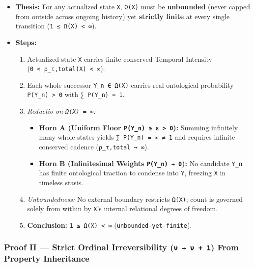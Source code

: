 \documentclass[
]{article}
\begin{document}
\begin{itemize}
\item
  \textbf{Thesis:} For any actualized state \texttt{X}, \texttt{Ω(X)}
  must be \textbf{unbounded} (never capped from outside across ongoing
  history) yet \textbf{strictly finite} at every single transition
  (\texttt{1~≤~Ω(X)~\textless{}~∞}).
\item
  \textbf{Steps:}

  \begin{enumerate}
  \def\labelenumi{\arabic{enumi}.}
  \item
    Actualized state \texttt{X} carries finite conserved Temporal
    Intensity (\texttt{0~\textless{}~ρ\_τ,total(X)~\textless{}~∞}).
  \item
    Each whole successor \texttt{\textquotesingle{}Y\_n~∈~Ω(X)} carries
    real ontological probability
    \texttt{P(\textquotesingle{}Y\_n)~\textgreater{}~0} with
    \texttt{∑~P(\textquotesingle{}Y\_n)~=~1}.
  \item
    \emph{Reductio on \texttt{Ω(X)~=~∞}:}

    \begin{itemize}
    \item
      \textbf{Horn A (Uniform Floor
      \texttt{P(\textquotesingle{}Y\_n)~≥~ε~\textgreater{}~0}):} Summing
      infinitely many whole states yields
      \texttt{∑~P(\textquotesingle{}Y\_n)~=~∞~≠~1} and requires infinite
      conserved cadence (\texttt{ρ\_τ,total~→~∞}).
    \item
      \textbf{Horn B (Infinitesimal Weights
      \texttt{P(\textquotesingle{}Y\_n)~→~0}):} No candidate
      \texttt{\textquotesingle{}Y\_n} has finite ontological traction to
      condense into \texttt{Y}, freezing \texttt{X} in timeless stasis.
    \end{itemize}
  \item
    \emph{Unboundedness:} No external boundary restricts \texttt{Ω(X)};
    count is governed solely from within by \texttt{X}'s internal
    relational degrees of freedom.
  \item
    \textbf{Conclusion:} \texttt{1~≤~Ω(X)~\textless{}~∞}
    (\texttt{unbounded-yet-finite}).
  \end{enumerate}
\end{itemize}

\subsubsection{\texorpdfstring{Proof II --- Strict Ordinal
Irreversibility (\texttt{ν~→~ν~+~1}) From Property
Inheritance}{Proof II --- Strict Ordinal Irreversibility (ν~→~ν~+~1) From Property Inheritance}}\label{proof-ii-strict-ordinal-irreversibility-ux3bd-ux3bd-1-from-property-inheritance}
\end{document}

